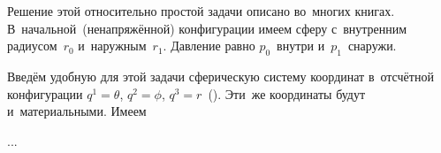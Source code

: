 

\label{para:hollowsphereunderpressure}

\begin{otherlanguage}{russian}

Решение этой относительно простой задачи описано во~многих книгах.
В~начальной~(ненапряжённой) конфигурации имеем сферу с~внутренним радиусом~${r_0}$ и~наружным~${r_1}$.
Давление равно $p_0$~внутри и~$p_1$~снаружи.

Введём удобную для этой задачи сферическую систему координат в~отсчётной конфигурации ${q^1 = \theta}$, ${q^2 = \phi}$, ${q^3 = r}$~().
Эти~же координаты будут и~материальными.
Имеем

...

\end{otherlanguage}

\newpage



\label{para:stressesAsLagrangeMultipliers}

